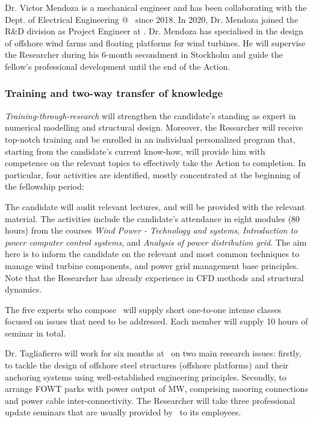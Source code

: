 Dr. Victor Mendoza is a mechanical engineer and has been collaborating with the Dept. of Electrical Engineering @ \UU\ since 2018. In 2020, Dr. Mendoza joined the R\&D division as Project Engineer at \Hexicon. Dr. Mendoza has specialised in the design of offshore wind farms and floating platforms for wind turbines. He will supervise the Researcher during his 6-month secondment in Stockholm and guide the fellow's professional development until the end of the Action. 

\vspace{-2ex}\subsubsection*{Training and two-way transfer of knowledge}\vspace{-1ex} 
\begin{description}[font=$\bullet$\scshape\bfseries, leftmargin=0pt,noitemsep,topsep=1pt,]
\item[\,Host to Researcher:] \emph{Training-through-research} will strengthen the candidate's standing as expert in numerical modelling and structural design. Moreover, the Researcher will receive top-notch training and be enrolled in an individual personalized program that, starting from the candidate's current know-how, will provide him with competence on the relevant topics to effectively take the Action to completion. In particular, four activities are identified, mostly concentrated at the beginning of the fellowship period:
\begin{description}[font=$\star$\scshape\bfseries, leftmargin=6pt,noitemsep,topsep=1pt,]
\item[\,Courses.] The candidate will audit relevant lectures, and will be provided with the relevant material. The activities include the candidate's attendance in eight modules (80 hours) from the courses \textit{Wind Power - Technology and systems}, \textit{Introduction to power computer control systems}, and \textit{Analysis of power distribution grid}. The aim here is to inform the candidate on the relevant and most common techniques to manage wind turbine components, and power grid management base principles. Note that the Researcher has already experience in CFD methods and structural dynamics.
\item[\,Personalized short seminars.] The five experts who compose \Gop\ will supply short one-to-one intense classes focused on issues that need to be addressed. Each member will supply 10 hours of seminar in total.
\item[\,Professional training.] Dr. Tagliafierro will work for six months at \Hexicon\ on two main research issues: firstly, to tackle the design of offshore steel structures (offshore platforms) and their anchoring systems using well-established engineering principles. Secondly, to arrange FOWT parks with power output of  MW, comprising mooring connections and power cable inter-connectivity. The Researcher will take three professional update seminars that are usually provided by \Hexicon\ to its employees.

\end{description}
\end{description}
